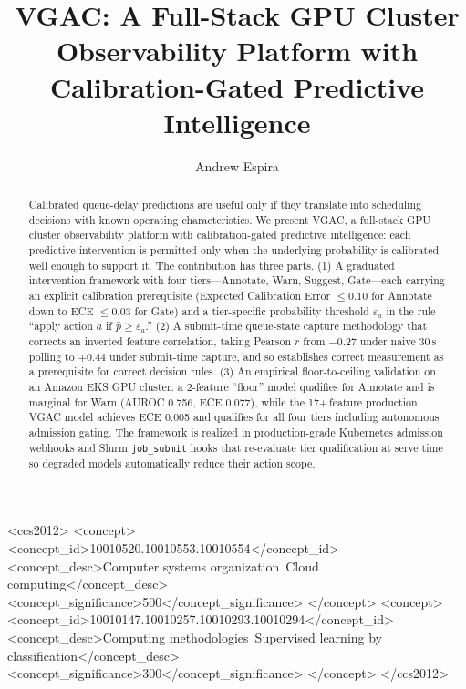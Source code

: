 \documentclass[sigconf]{acmart}
\begin{document}
\title{VGAC: A Full-Stack GPU Cluster Observability Platform with Calibration-Gated Predictive Intelligence}

\author{Andrew Espira}

\renewcommand{\shortauthors}{Espira}

\begin{abstract}
Calibrated queue-delay predictions are useful only if they translate into scheduling decisions with known operating characteristics. We present VGAC, a full-stack GPU cluster observability platform with calibration-gated predictive intelligence: each predictive intervention is permitted only when the underlying probability is calibrated well enough to support it. The contribution has three parts. (1) A graduated intervention framework with four tiers---Annotate, Warn, Suggest, Gate---each carrying an explicit calibration prerequisite (Expected Calibration Error $\le 0.10$ for Annotate down to ECE $\le 0.03$ for Gate) and a tier-specific probability threshold $\varepsilon_a$ in the rule ``apply action $a$ if $\hat{p} \ge \varepsilon_a$.'' (2) A submit-time queue-state capture methodology that corrects an inverted feature correlation, taking Pearson $r$ from $-0.27$ under naive 30\,s polling to $+0.44$ under submit-time capture, and so establishes correct measurement as a prerequisite for correct decision rules. (3) An empirical floor-to-ceiling validation on an Amazon EKS GPU cluster: a 2-feature ``floor'' model qualifies for Annotate and is marginal for Warn (AUROC 0.756, ECE 0.077), while the 17+\,feature production VGAC model achieves ECE 0.005 and qualifies for all four tiers including autonomous admission gating. The framework is realized in production-grade Kubernetes admission webhooks and Slurm \texttt{job\_submit} hooks that re-evaluate tier qualification at serve time so degraded models automatically reduce their action scope.
\end{abstract}

\begin{CCSXML}
<ccs2012>
<concept>
<concept_id>10010520.10010553.10010554</concept_id>
<concept_desc>Computer systems organization~Cloud computing</concept_desc>
<concept_significance>500</concept_significance>
</concept>
<concept>
<concept_id>10010147.10010257.10010293.10010294</concept_id>
<concept_desc>Computing methodologies~Supervised learning by classification</concept_desc>
<concept_significance>300</concept_significance>
</concept>
</ccs2012>
\end{CCSXML}
\end{document}

